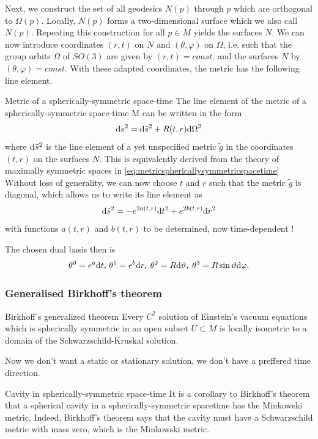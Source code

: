 Next, we construct the set of all geodesics $N(p)$ through $p$ which are
orthogonal to $Ω(p)$. Locally, $N(p)$ forms a two-dimensional surface
which we also call $N(p)$. Repeating this construction for all $p \in M$
yields the surfaces $N$.
We can now introduce coordinates $(r, t)$ on $N$ and $(θ, φ)$ on $Ω$, i.e. such
that the group orbits $Ω$ of $SO(3)$ are given by $(r, t) = const.$ and the
surfaces $N$ by $(θ, φ) = const.$ With these adapted coordinates, the metric has the following line element.
\begin{mybox}{Metric of a spherically-symmetric space-time}
	The line element of the metric of a spherically-symmetric space-time
	M can be written in the form
	\begin{equation}
	\mathrm{d} s^2 = \mathrm{d} \tilde{s}^2 + R(t,r) \mathrm{d} \Omega^2
	\end{equation}
	where $\mathrm{d} \tilde{s}^2$ is the line element of a yet unspecified metric $\tilde{g}$ in the
	coordinates $(t, r)$ on the surfaces $N$. This is equivalently derived from the theory of maximally symmetric spaces in \ref{eq:metricsphericallysymmetricspacetime}
	Without loss of generality, we can now choose $t$ and $r$ such that the
	metric $\tilde{g}$ is diagonal, which allows us to write its line element as
	\begin{equation}
	\mathrm{d} \tilde{s}^2 = -e^{2a(t,r)} \mathrm{d} t^2 +e^{2 b(t,r)} \mathrm{d} r^2
	\end{equation}
	with functions $a(t, r)$ and $b(t, r)$ to be determined, now time-dependent !
\end{mybox}
The chosen dual basis then is
\begin{equation}
\theta^0 = e^a \mathrm{d} t, \, \theta^1 =e^b \mathrm{d} r, \; \theta^2 = R \mathrm{d} \vartheta, \; \theta^3 = R \sin \vartheta \mathrm{d} \varphi.
\end{equation}


\subsubsection{Generalised Birkhoff's theorem}
\begin{mybox}{Birkhoff's generalized theorem}
	Every $C^2$ solution of Einstein’s vacuum equations which is spherically
	symmetric in an open subset $U \subset M$ is locally isometric to a domain
	of the Schwarzschild-Kruskal solution.
\end{mybox}
Now we don't want a static or stationary solution, we don't have a preffered time direction. 
\begin{mybox}{Cavity in spherically-symmetric space-time}
	It is a corollary to Birkhoff’s theorem that a spherical cavity in a
	spherically-symmetric spacetime has the Minkowski metric. Indeed,
	Birkhoff’s theorem says that the cavity must have a Schwarzschild
	metric with mass zero, which is the Minkowski metric.
\end{mybox}


